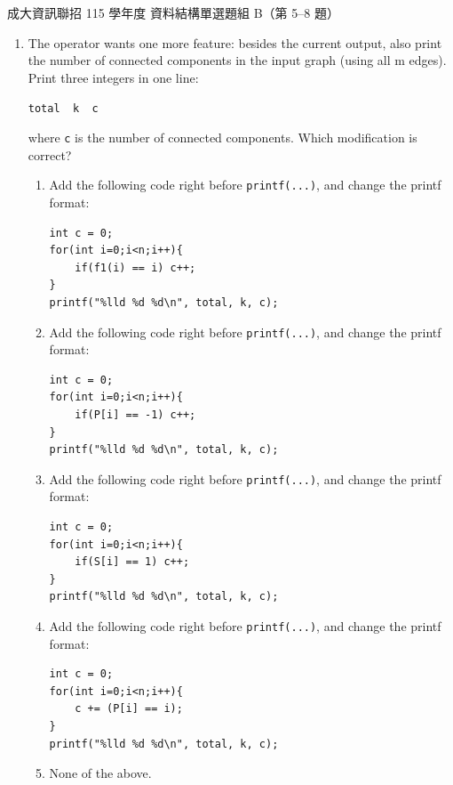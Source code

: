\begin{pastexam}[label={px:ncku-115-prog-05}]{成大資訊聯招 115 學年度 資料結構單選題組 B（第 5--8 題）}
\begin{enumerate}
(A)~$\{0, 1, 4\}$ \qquad (B)~$\{0, 2, 3\}$ \qquad (C)~$\{1, 3, 5\}$ \qquad (D)~$\{0, 1, 3\}$
\qquad (E)~No articulation point

\item[8.] [3\%] The operator wants one more feature: besides the current output, also print the number
of connected components in the input graph (using all m edges). Print three integers in one line:
\begin{center}\texttt{total \ k \ c}\end{center}
where \texttt{c} is the number of connected components. Which modification is correct?

\begin{enumerate}[label=(\Alph*)]
\item Add the following code right before \texttt{printf(...)}, and change the printf format:
\begin{verbatim}
int c = 0;
for(int i=0;i<n;i++){
    if(f1(i) == i) c++;
}
printf("%lld %d %d\n", total, k, c);
\end{verbatim}
\item Add the following code right before \texttt{printf(...)}, and change the printf format:
\begin{verbatim}
int c = 0;
for(int i=0;i<n;i++){
    if(P[i] == -1) c++;
}
printf("%lld %d %d\n", total, k, c);
\end{verbatim}
\item Add the following code right before \texttt{printf(...)}, and change the printf format:
\begin{verbatim}
int c = 0;
for(int i=0;i<n;i++){
    if(S[i] == 1) c++;
}
printf("%lld %d %d\n", total, k, c);
\end{verbatim}
\item Add the following code right before \texttt{printf(...)}, and change the printf format:
\begin{verbatim}
int c = 0;
for(int i=0;i<n;i++){
    c += (P[i] == i);
}
printf("%lld %d %d\n", total, k, c);
\end{verbatim}
\item None of the above.
\end{enumerate}
\end{enumerate}
\end{pastexam}

